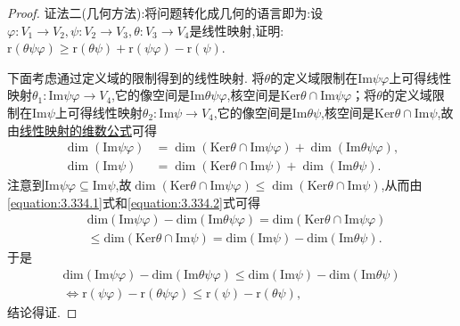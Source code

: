 \documentclass[../../main.tex]{subfiles}%
\begin{document}
\begin{proof}
{\color{blue}证法二(几何方法):}将问题转化成几何的语言即为:设\(\varphi:V_1\to V_2,\psi:V_2\to V_3,\theta:V_3\to V_4\)是线性映射,证明:\(\text{r}(\theta\psi\varphi)\geqslant \text{r}(\theta\psi)+\text{r}(\psi\varphi)-\text{r}(\psi)\).

下面考虑通过定义域的限制得到的线性映射. 将\(\theta\)的定义域限制在\(\text{Im}\psi\varphi\)上可得线性映射\(\theta_1:\text{Im}\psi\varphi\to V_4\),它的像空间是\(\text{Im}\theta\psi\varphi\),核空间是\(\text{Ker}\theta\cap\text{Im}\psi\varphi\)；将\(\theta\)的定义域限制在\(\text{Im}\psi\)上可得线性映射\(\theta_2:\text{Im}\psi\to V_4\),它的像空间是\(\text{Im}\theta\psi\),核空间是\(\text{Ker}\theta\cap\text{Im}\psi\),故由\hyperref[theorem:线性映射的维数公式]{线性映射的维数公式}可得
\begin{align}
\dim(\text{Im}\psi\varphi)&=\dim(\text{Ker}\theta\cap\text{Im}\psi\varphi)+\dim(\text{Im}\theta\psi\varphi),\label{equation:3.334.1}\\
\dim(\text{Im}\psi)&=\dim(\text{Ker}\theta\cap\text{Im}\psi)+\dim(\text{Im}\theta\psi).\label{equation:3.334.2}
\end{align}
注意到\(\text{Im}\psi\varphi\subseteq\text{Im}\psi\),故\(\dim(\text{Ker}\theta\cap\text{Im}\psi\varphi)\leqslant \dim(\text{Ker}\theta\cap\text{Im}\psi)\),从而由\eqref{equation:3.334.1}式和\eqref{equation:3.334.2}式可得
\begin{align*}
&\mathrm{dim}\left( \mathrm{Im}\psi \varphi \right) -\mathrm{dim}\left( \mathrm{Im}\theta \psi \varphi \right) =\mathrm{dim}\left( \mathrm{Ker}\theta \cap \mathrm{Im}\psi \varphi \right) 
\\
&\leqslant \mathrm{dim}\left( \mathrm{Ker}\theta \cap \mathrm{Im}\psi \right) =\mathrm{dim}\left( \mathrm{Im}\psi \right) -\mathrm{dim}\left( \mathrm{Im}\theta \psi \right) .
\end{align*}
于是
\begin{gather*}
\mathrm{dim}\left( \mathrm{Im}\psi \varphi \right) -\mathrm{dim}\left( \mathrm{Im}\theta \psi \varphi \right) \leqslant \mathrm{dim}\left( \mathrm{Im}\psi \right) -\mathrm{dim}\left( \mathrm{Im}\theta \psi \right) 
\\
\Leftrightarrow \text{r}(\psi\varphi)-\text{r}(\theta\psi\varphi)\leqslant \text{r}(\psi)-\text{r}(\theta\psi),
\end{gather*}
结论得证. 
\end{proof}
\end{document}
